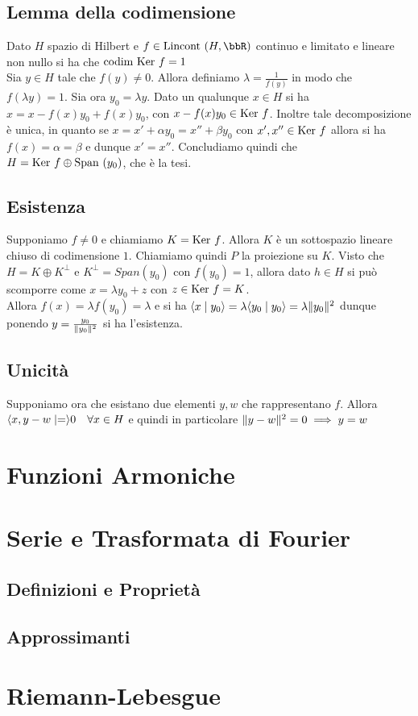 \documentclass[a4paper,NoNotes,GeneralMath]{stdmdoc}
\newcommand{\Lincont}{\text{Lincont }}
\newcommand{\codim}{\text{codim }}
\begin{document}
	\subsection*{Lemma della codimensione}
	Dato $H$ spazio di Hilbert e $f \in \Lincont(H, \bbR)$ continuo e limitato e lineare non nullo si ha che $\codim \Ker f = 1$ \\
	
	Sia $y \in H$ tale che $f(y) \neq 0$. Allora definiamo $\lambda = \frac{1}{f(y)}$ in modo che $f(\lambda y) = 1$. Sia ora $y_0 = \lambda y$. Dato un qualunque $x \in H$ si ha $x = x - f(x)y_0 + f(x)y_0$, con $x - f(x)y_0 \in \mbox{Ker } f$. Inoltre tale decomposizione è unica, in quanto se $x = x' + \alpha y_0 = x'' + \beta y_0$ con $x', x'' \in \mbox{Ker } f$ allora si ha $f(x) = \alpha = \beta$ e dunque $x' = x''$. Concludiamo quindi che $H = \mbox{Ker } f \oplus \mbox{Span }(y_0)$, che è la tesi.
	
	\subsection*{Esistenza}
	Supponiamo $f \neq 0$ e chiamiamo $K = \mbox{Ker } f$. Allora $K$ è un sottospazio lineare chiuso di codimensione $1$. Chiamiamo quindi $P$ la proiezione su $K$. Visto che $H = K \oplus K^\bot$ e $K^\bot = Span(y_0)$ con $f(y_0) = 1$, allora dato $h \in H$ si può scomporre come $x = \lambda y_0 + z$ con $z \in \mbox{Ker } f = K$. \\
	Allora $f(x) = \lambda f(y_0) = \lambda$ e si ha $\langle x \mid y_0 \rangle = \lambda \langle y_0 \mid y_0 \rangle = \lambda \| {y_0} \|^2$ dunque ponendo $y = \frac{y_0}{\| {y_0} \|^2}$ si ha l'esistenza. \\
	
	\subsection*{Unicità}
	Supponiamo ora che esistano due elementi $y, w$ che rappresentano $f$. Allora $\langle x, y - w \mid = \rangle 0 \quad \forall x \in H$ e quindi in particolare $\| {y - w} \|^2 = 0 \implies y = w$
	
	\section*{Funzioni Armoniche}
	
	\section*{Serie e Trasformata di Fourier}
	\subsection*{Definizioni e Proprietà}
	\subsection*{Approssimanti}
	
	\section*{Riemann-Lebesgue}
\end{document}
